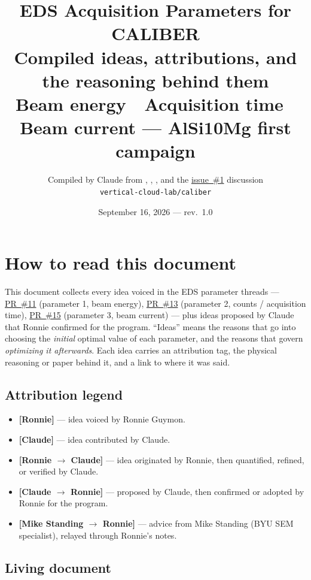 \documentclass[11pt]{article}
\title{\textbf{EDS Acquisition Parameters for CALIBER}\\[4pt]
\large Compiled ideas, attributions, and the reasoning behind them\\
\normalsize Beam energy \,\textperiodcentered\, Acquisition time \,\textperiodcentered\, Beam current --- AlSi10Mg first campaign}
\author{Compiled by Claude from \pr{11}, \pr{13}, \pr{15}, and the
\href{https://github.com/vertical-cloud-lab/caliber/issues/1}{issue~\#1} discussion\\
\texttt{vertical-cloud-lab/caliber}}
\date{September 16, 2026 --- rev.\ 1.0}
\newcommand{\tR}{\textcolor{cR}{\textbf{[Ronnie]}}}
\newcommand{\tC}{\textcolor{cC}{\textbf{[Claude]}}}
\newcommand{\tRC}{\textcolor{cRC}{\textbf{[Ronnie $\to$ Claude]}}}
\newcommand{\tCR}{\textcolor{cCR}{\textbf{[Claude $\to$ Ronnie]}}}
\newcommand{\tMS}{\textcolor{cMS}{\textbf{[Mike Standing $\to$ Ronnie]}}}
\newcommand{\pr}[1]{\href{https://github.com/vertical-cloud-lab/caliber/pull/#1}{PR~\##1}}
\begin{document}
\maketitle

\section{How to read this document}

This document collects every idea voiced in the EDS parameter threads --- \pr{11}
(parameter 1, beam energy), \pr{13} (parameter 2, counts / acquisition time),
\pr{15} (parameter 3, beam current) --- plus ideas proposed by Claude that Ronnie
confirmed for the program. ``Ideas'' means the reasons that go into choosing the
\emph{initial} optimal value of each parameter, and the reasons that govern
\emph{optimizing it afterwards}. Each idea carries an attribution tag, the physical
reasoning or paper behind it, and a link to where it was said.

\subsection*{Attribution legend}
\begin{itemize}[itemsep=1pt]
  \item \tR{} --- idea voiced by Ronnie Guymon.
  \item \tC{} --- idea contributed by Claude.
  \item \tRC{} --- idea originated by Ronnie, then quantified, refined, or verified by Claude.
  \item \tCR{} --- proposed by Claude, then confirmed or adopted by Ronnie for the program.
  \item \tMS{} --- advice from Mike Standing (BYU SEM specialist), relayed through Ronnie's notes.
\end{itemize}

\subsection*{Living document}
\noindent{}
\end{document}
